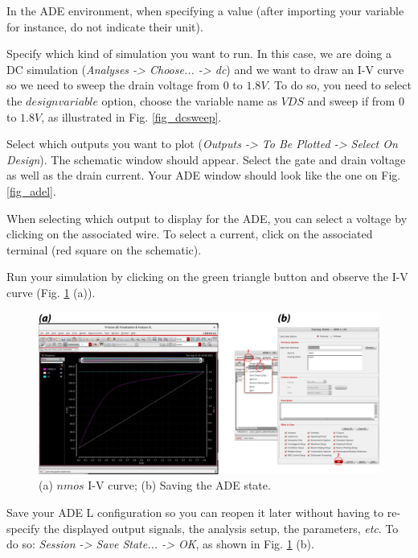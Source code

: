 \begin{enumerate}
{		\begin{warning}
		In the ADE environment, when specifying a value (after importing your variable for instance, do not indicate their unit).
		\end{warning}
		\item Specify which kind of simulation you want to run. In this case, we are doing a DC simulation (\textit{Analyses -> Choose... -> dc}) and we want to draw an I-V curve so we need to sweep the drain voltage from $0$ to $1.8V$. To do so, you need to select the $design variable$ option, choose the variable name as $VDS$ and sweep if from $0$ to $1.8V$, as illustrated in Fig. \ref{fig_dcsweep}.
		\item Select which outputs you want to plot (\textit{Outputs -> To Be Plotted -> Select On Design}). The schematic window should appear. Select the gate and drain voltage as well as the drain current. Your ADE window should look like the one on Fig. \ref{fig_adel}.
		\begin{remark}
			When selecting which output to display for the ADE, you can select a voltage by clicking on the associated wire. To select a current, click on the associated terminal (red square on the schematic). 
	\end{remark}} 
	\item Run your simulation by clicking on the green triangle button and observe the I-V curve (Fig. \ref{fig_savestate} (a)).
	
	
	
	
	
	\begin{figure}[!h]
		\centering
		\includegraphics[scale=0.25]{figures/lab1_schematic_sim/save_state}
		\caption{(a) $nmos$ I-V curve; (b) Saving the ADE state.}
		\label{fig_savestate}
	\end{figure}
	
	
	\item Save your ADE L configuration so you can reopen it later without having to re-specify the displayed output signals, the analysis setup, the parameters, \textit{etc}. To do so: \textit{Session -> Save State... -> OK}, as shown in Fig. \ref{fig_savestate} (b).
	

\end{enumerate}
